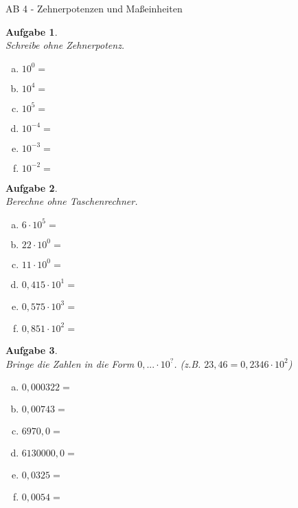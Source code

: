 \documentclass[12pt,fleqn]{article}
\theoremstyle{aufg}
\newtheorem{aufgabe}{Aufgabe}
\theoremstyle{bsp}
\begin{document}
 
    \begin{flushleft}
\begin{center}AB 4 - Zehnerpotenzen und Ma\ss{}einheiten\end{center}\begin{aufgabe} ~ \\ 
Schreibe ohne Zehnerpotenz. \\ 
\begin{multicols}{3} 
\begin{enumerate}[a)] 
\item 
$10^{0}=$
\item 
$10^{4}=$
\item 
$10^{5}=$
\item 
$10^{-4}=$
\item 
$10^{-3}=$
\item 
$10^{-2}=$
\end{enumerate} 
\end{multicols} 
\end{aufgabe} 
\begin{aufgabe} ~ \\ 
Berechne ohne Taschenrechner. \\ 
\begin{multicols}{3} 
\begin{enumerate}[a)] 
\item 
$6\cdot10^{5}=$
\item 
$22\cdot10^{0}=$
\item 
$11\cdot10^{0}=$
\item 
$0,415\cdot10^{1}=$
\item 
$0,575\cdot10^{3}=$
\item 
$0,851\cdot10^{2}=$
\end{enumerate} 
\end{multicols} 
\end{aufgabe} 
\begin{aufgabe} ~ \\ 
Bringe die Zahlen in die Form $0,... \cdot 10^{?}$. (z.B. $23,46 = 0,2346 \cdot 10^2$) \\ 
\begin{multicols}{3} 
\begin{enumerate}[a)] 
\item 
$0,000322=$
\item 
$0,00743=$
\item 
$6970,0=$
\item 
$6130000,0=$
\item 
$0,0325=$
\item 
$0,0054=$
\end{enumerate} 

\end{multicols}
\end{aufgabe}
\end{flushleft}
\end{document}
